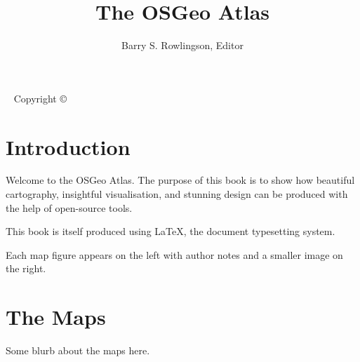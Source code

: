 \documentclass[a4paper,sfsidenotes,justified]{tufte-book}
\title{The OSGeo Atlas}
\author{Barry S. Rowlingson, Editor}
\begin{document}
\maketitle

\newpage
\begin{fullwidth}
~\vfill
\setlength{\parindent}{0pt}
\setlength{\parskip}{\baselineskip}
Copyright \copyright\ \the\year\ \thanklessauthor


\end{fullwidth}



\tableofcontents

\chapter{Introduction}

Welcome to the OSGeo Atlas. The purpose of this book is to show how
beautiful cartography, insightful visualisation, and stunning design
can be produced with the help of open-source tools.

This book is itself produced using \LaTeX, the document typesetting system.

Each map figure appears on the left with author notes and a smaller
image on the right.

\chapter{The Maps}
Some blurb about the maps here.









\backmatter

\printindex
\end{document}
